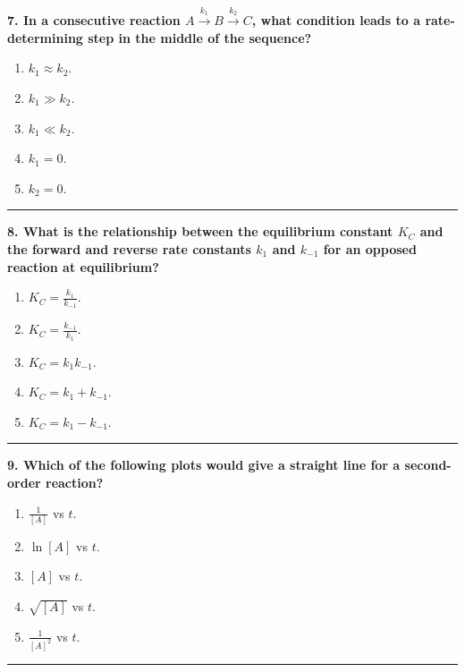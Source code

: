 \documentclass[
  9pt,
]{extbook}
\providecommand{\tightlist}{%
  \setlength{\itemsep}{0pt}\setlength{\parskip}{0pt}}
\theoremstyle{definition}
\theoremstyle{definition}
\theoremstyle{definition}
\theoremstyle{definition}
\theoremstyle{remark}
\begin{document}
\textbf{7. In a consecutive reaction \(A \xrightarrow{k_1} B \xrightarrow{k_2} C\), what condition leads to a rate-determining step in the middle of the sequence?}

\begin{enumerate}
\def\labelenumi{\alph{enumi}.}
\tightlist
\item
  \(k_1 \approx k_2\).
\item
  \(k_1 \gg k_2\).
\item
  \(k_1 \ll k_2\).
\item
  \(k_1 = 0\).
\item
  \(k_2 = 0\).
\end{enumerate}

\begin{center}\rule{0.5\linewidth}{0.5pt}\end{center}

\textbf{8. What is the relationship between the equilibrium constant \(K_C\) and the forward and reverse rate constants \(k_1\) and \(k_{-1}\) for an opposed reaction at equilibrium?}

\begin{enumerate}
\def\labelenumi{\alph{enumi}.}
\tightlist
\item
  \(K_C = \frac{k_1}{k_{-1}}\).
\item
  \(K_C = \frac{k_{-1}}{k_1}\).
\item
  \(K_C = k_1 k_{-1}\).
\item
  \(K_C = k_1 + k_{-1}\).
\item
  \(K_C = k_1 - k_{-1}\).
\end{enumerate}

\begin{center}\rule{0.5\linewidth}{0.5pt}\end{center}

\textbf{9. Which of the following plots would give a straight line for a second-order reaction?}

\begin{enumerate}
\def\labelenumi{\alph{enumi}.}
\tightlist
\item
  \(\frac{1}{[A]}\) vs \(t\).
\item
  \(\ln[A]\) vs \(t\).
\item
  \([A]\) vs \(t\).
\item
  \(\sqrt{[A]}\) vs \(t\).
\item
  \(\frac{1}{[A]^2}\) vs \(t\).
\end{enumerate}

\begin{center}\rule{0.5\linewidth}{0.5pt}\end{center}
\end{document}

